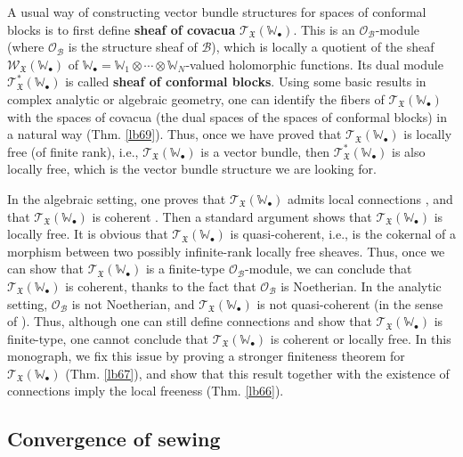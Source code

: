 \documentclass[12pt,a4paper,notitlepage]{report}
\theoremstyle{definition}
\theoremstyle{plain}
\newcommand{\fk}{\mathfrak}
\newcommand{\mc}{\mathcal}
\newcommand{\scr}{\mathscr}
\newcommand{\blt}{\bullet}
\newcommand{\Wbb}{\mathbb W}
\numberwithin{equation}{section}
\begin{document}
	
A usual way of constructing vector bundle structures for spaces of conformal blocks is to first define \textbf{sheaf of covacua} $\scr T_{\fk X}(\Wbb_\blt)$. This is an $\scr O_{\mc B}$-module (where $\scr O_{\mc B}$ is the structure sheaf of $\mc B$), which is locally a quotient of the sheaf $\scr W_{\fk X}(\Wbb_\blt)$ of $\Wbb_\blt=\Wbb_1\otimes\cdots\otimes\Wbb_N$-valued holomorphic functions. Its dual module $\scr T_{\fk X}^*(\Wbb_\blt)$ is called \textbf{sheaf of conformal blocks}. Using some basic results in complex analytic or algebraic geometry, one can identify the fibers of $\scr T_{\fk X}(\Wbb_\blt)$ with the spaces of covacua (the dual spaces of the spaces of conformal blocks) in a natural way (Thm. \ref{lb69}). Thus, once we have proved that $\scr T_{\fk X}(\Wbb_\blt)$ is locally free (of finite rank), i.e., $\scr T_{\fk X}(\Wbb_\blt)$ is a vector bundle, then $\scr T_{\fk X}^*(\Wbb_\blt)$ is also locally free, which is the vector bundle structure we are looking for. 

In the algebraic setting, one proves  that $\scr T_{\fk X}(\Wbb_\blt)$ admits  local connections \cite{FB04,DGT19a}, and that $\scr T_{\fk X}(\Wbb_\blt)$ is coherent \cite{DGT19b}. Then a standard argument shows that $\scr T_{\fk X}(\Wbb_\blt)$ is locally free. It is obvious that $\scr T_{\fk X}(\Wbb_\blt)$ is quasi-coherent, i.e., is the cokernal of a morphism between two possibly infinite-rank locally free sheaves. Thus, once we can show that $\scr T_{\fk X}(\Wbb_\blt)$ is a finite-type $\scr O_{\mc B}$-module, we can conclude that $\scr T_{\fk X}(\Wbb_\blt)$ is coherent, thanks to the fact that $\scr O_{\mc B}$ is Noetherian.  In the analytic setting, $\scr O_{\mc B}$ is not Noetherian, and $\scr T_{\fk X}(\Wbb_\blt)$ is not quasi-coherent (in the sense of \cite{EP96}). Thus, although one can still define connections and show that $\scr T_{\fk X}(\Wbb_\blt)$ is finite-type, one cannot conclude that $\scr T_{\fk X}(\Wbb_\blt)$ is coherent or locally free. In this monograph, we fix this issue by proving a stronger finiteness theorem for $\scr T_{\fk X}(\Wbb_\blt)$ (Thm. \ref{lb67}), and show that this result together with the existence of connections imply the local freeness (Thm. \ref{lb66}).
	



\subsection*{Convergence of sewing}
\end{document}
